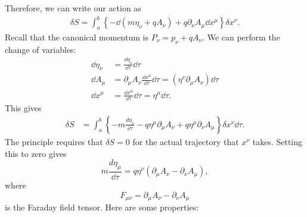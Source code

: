 \documentclass{article}
\numberwithin{equation}{section}
\begin{document}
Therefore, we can write our action as 
\begin{align}
    \delta S = \int_a^b \left\{ -\dd{(m\eta_\nu + qA_\nu)} + q\partial_\nu A_\mu \dd{x}^\mu\right\} \delta x^\nu.
\end{align}
Recall that the canonical momentum is $P_\nu = p_\nu + qA_\nu.$ We can perform the change of variables:
\begin{align}
    \dd{\eta}_\nu &= \frac{\dd{\eta_\nu}}{\dd{\tau}}\dd{\tau} \\ 
    \dd{A}_\mu &= \partial_\mu A_\nu \frac{\dd{x}^\mu}{\dd{\tau}}\dd{\tau} = (\eta^\nu \partial_\mu A_\nu) \dd{\tau} \\ 
    \dd{x^\mu} &= \frac{\dd{x}^\mu}{\dd{\tau}}\dd{\tau} = \eta^\mu \dd{\tau}.
\end{align} 
This gives 
\begin{align}
    \delta S &= \int_a^b \left\{ - m \frac{d\eta_\nu}{\dd{\tau}} - q\eta^\mu \partial_\mu A_\nu + q\eta^\mu \partial_\nu A_\mu\right\} \delta x^\nu \dd{\tau}.
\end{align}
The principle requires that $\delta S = 0$ for the actual trajectory that $x^\nu$ takes. Setting this to zero gives 
\begin{equation}
    \boxed{m\frac{d\eta_\mu}{\dd{\tau}} = q\eta^\nu \left(\partial_\mu A_\nu - \partial_\nu A_\mu\right)},
\end{equation}
where 
\begin{equation}
    F_{\mu\nu} = \partial_\mu A_\nu - \partial_\nu A_\mu
\end{equation}
is the Faraday field tensor. Here are some properties:
\end{document}

